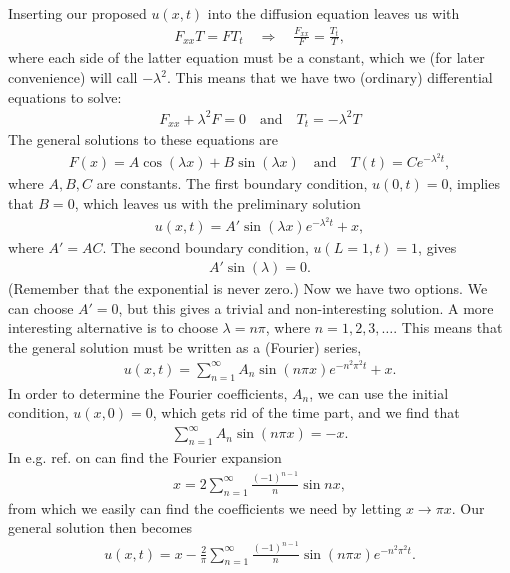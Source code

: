 \documentclass[12pt, a4paper]{article}
\begin{document}
Inserting our proposed $u(x,t)$ into the diffusion equation leaves us with 
\begin{align*}
F_{xx} T = F T_t \quad \Rightarrow \quad \frac{F_{xx}}{F} = \frac{T_t}{T}, 
\end{align*} 
where each side of the latter equation must be a constant, which we (for later convenience) will call 
$-\lambda^2$. This means that we have two (ordinary) differential equations to solve: 
\begin{align*}
F_{xx} + \lambda^2 F = 0 \quad \text{and} \quad T_t = -\lambda^2 T 
\end{align*}  
The general solutions to these equations are 
\begin{align*}
F(x) = A \cos(\lambda x) + B \sin (\lambda x)  \quad \text{and} \quad  T(t) = C e^{-\lambda^2t}, 
\end{align*}
where $A,B,C$ are constants. The first boundary condition, $u(0,t)=0$, implies that $B=0$, which leaves 
us with the preliminary solution 
\begin{align*}
u(x,t) = A' \sin(\lambda x) e^{-\lambda^2 t} + x,   
\end{align*}
where $A' = AC$. The second boundary condition, $u(L=1, t)=1$, gives 
\begin{align*}
A'\sin (\lambda) = 0.  
\end{align*}
(Remember that the exponential is never zero.)
Now we have two options. We can choose $A'=0$, but this gives a trivial and non-interesting solution. A 
more interesting alternative is to choose $\lambda = n\pi$, where $n=1,2,3,\dots$. This means 
that the general solution must be written as a (Fourier) series, 
\begin{align*}
u(x,t) = \sum_{n=1}^\infty A_n \sin(n\pi x) e^{-n^2\pi^2t} + x. 
\end{align*}  
In order to determine the Fourier coefficients, $A_n$, we can use the initial condition, $u(x,0)=0$, 
which gets rid of the time part, and we find that 
\begin{align*}
\sum_{n=1}^\infty A_n \sin(n\pi x) = -x. 
\end{align*}  
In e.g. ref. \cite{Rottmann} on can find the Fourier expansion 
\begin{align*}
x = 2 \sum_{n=1}^\infty \frac{(-1)^{n-1}}{n} \sin nx,   
\end{align*} 
from which we easily can find the coefficients we need by letting $x\rightarrow \pi x$. Our general 
solution then becomes 
\begin{align*}
u(x,t) = x - \frac{2}{\pi} \sum_{n=1}^\infty \frac{(-1)^{n-1}}{n} \sin(n\pi x) e^{-n^2\pi^2t}. 
\end{align*}
\end{document}
